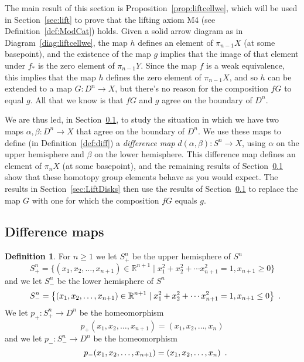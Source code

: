 \documentclass[12pt]{amsart}
\numberwithin{equation}{section}
\theoremstyle{slplain}
\theoremstyle{definition}
\newtheorem{defn}[equation]{Definition} %
\theoremstyle{remark}
\newcommand{\propref}{Proposition~\ref}
\newcommand{\defref}{Definition~\ref}
\newcommand{\diagref}{Diagram~\ref}
\newcommand{\secref}{Section~\ref}
\newcommand{\R}{\mathbb{R}}
\newcommand{\suchthat}{\mid}
\newcommand{\Period}{\rlap{\enspace .}}
\begin{document}
The main result of this section is \propref{prop:liftcellwe}, which
will be used in \secref{sec:lift} to prove that the lifting axiom M4
(see \defref{def:ModCat}) holds.  Given a solid arrow diagram as in
\diagref{diag:liftcellwe}, the map $h$ defines an element of
$\pi_{n-1}X$ (at some basepoint), and the existence of the map $g$
implies that the image of that element under $f_{*}$ is the zero
element of $\pi_{n-1}Y$.  Since the map $f$ is a weak equivalence,
this implies that the map $h$ defines the zero element of
$\pi_{n-1}X$, and so $h$ can be extended to a map $G\colon D^{n} \to
X$, but there's no reason for the composition $fG$ to equal $g$.  All
that we know is that $fG$ and $g$ agree on the boundary of $D^{n}$.

We are thus led, in \secref{sec:DiffMp}, to study the situation in
which we have two maps $\alpha,\beta\colon D^{n} \to X$ that agree on
the boundary of $D^{n}$.  We use these maps to define (in
\defref{def:diff}) a \emph{difference map} $d(\alpha,\beta)\colon
S^{n} \to X$, using $\alpha$ on the upper hemisphere and $\beta$ on
the lower hemisphere.  This difference map defines an element of
$\pi_{n}X$ (at some basepoint), and the remaining results of
\secref{sec:DiffMp} show that these homotopy group elements behave as
you would expect.  The results in \secref{sec:LiftDisks} then use the
results of \secref{sec:DiffMp} to replace the map $G$ with one for
which the composition $fG$ equals $g$.

\subsection{Difference maps}
\label{sec:DiffMp}

\begin{defn}
  \label{def:hemisphere}
  For $n \ge 1$ we let $S^{n}_{+}$ be the upper hemisphere of $S^{n}$
  \begin{displaymath}
    S^{n}_{+} = \bigl\{(x_{1}, x_{2}, \ldots, x_{n+1}) \in \R^{n+1}
    \suchthat x_{1}^{2} + x_{2}^{2} + \cdots x_{n+1}^{2} = 1,
    x_{n+1} \ge 0 \bigr\}
  \end{displaymath}
  and we let $S^{n}_{-}$ be the lower hemisphere of $S^{n}$
  \begin{displaymath}
    S^{n}_{-} = \bigl\{(x_{1}, x_{2}, \ldots, x_{n+1}) \in \R^{n+1}
    \suchthat x_{1}^{2} + x_{2}^{2} + \cdots x_{n+1}^{2} = 1,
    x_{n+1} \le 0 \bigr\} \Period
  \end{displaymath}
  We let $p_{+}\colon S^{n}_{+} \to D^{n}$ be the homeomorphism
  \begin{displaymath}
    p_{+}(x_{1}, x_{2}, \ldots, x_{n+1}) =
    (x_{1}, x_{2}, \ldots, x_{n})
  \end{displaymath}
  and we let $p_{-}\colon S^{n}_{-} \to D^{n}$ be the homeomorphism
  \begin{displaymath}
    p_{-}(x_{1}, x_{2}, \ldots, x_{n+1}) =
    (x_{1}, x_{2}, \ldots, x_{n}) \Period
  \end{displaymath}
\end{defn}
\end{document}
